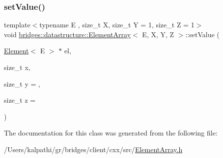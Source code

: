 \mbox{\label{classbridges_1_1datastructure_1_1_element_array_aecd1e6ae5a15c74837f2bfe9d7fbeb60}} 
\subsubsection{\texorpdfstring{set\+Value()}{setValue()}}
{\footnotesize\ttfamily template$<$typename E , size\+\_\+t X, size\+\_\+t Y = 1, size\+\_\+t Z = 1$>$ \\
void \mbox{\hyperlink{classbridges_1_1datastructure_1_1_element_array}{bridges\+::datastructure\+::\+Element\+Array}}$<$ E, X, Y, Z $>$\+::set\+Value (\begin{DoxyParamCaption}\item[{\mbox{\hyperlink{classbridges_1_1datastructure_1_1_element}{Element}}$<$ E $>$ $\ast$}]{el,  }\item[{size\+\_\+t}]{x,  }\item[{size\+\_\+t}]{y = {},  }\item[{size\+\_\+t}]{z = {} }\end{DoxyParamCaption})\hspace{0.3cm}{\ttfamily [inline]}}



The documentation for this class was generated from the following file\+:\begin{DoxyCompactItemize}
\item 
/\+Users/kalpathi/gr/bridges/client/cxx/src/\mbox{\hyperlink{_element_array_8h}{Element\+Array.\+h}}\end{DoxyCompactItemize}
